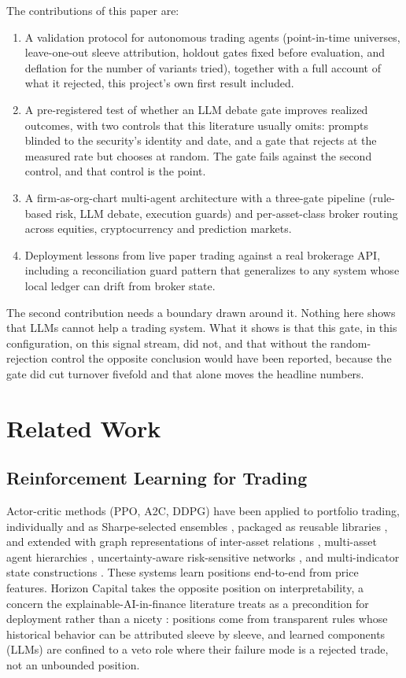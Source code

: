 \documentclass[10pt,twocolumn]{IEEEtran}
\begin{document}
The contributions of this paper are:
\begin{enumerate}
\item A validation protocol for autonomous trading agents (point-in-time
universes, leave-one-out sleeve attribution, holdout gates fixed before
evaluation, and deflation for the number of variants tried), together with
a full account of what it rejected, this project's own first result included.
\item A pre-registered test of whether an LLM debate gate improves realized
outcomes, with two controls that this literature usually omits: prompts
blinded to the security's identity and date, and a gate that rejects at the
measured rate but chooses at random. The gate fails against the second
control, and that control is the point.
\item A firm-as-org-chart multi-agent architecture with a three-gate pipeline
(rule-based risk, LLM debate, execution guards) and per-asset-class broker
routing across equities, cryptocurrency and prediction markets.
\item Deployment lessons from live paper trading against a real brokerage
API, including a reconciliation guard pattern that generalizes to any system
whose local ledger can drift from broker state.
\end{enumerate}

The second contribution needs a boundary drawn around it. Nothing here shows
that LLMs cannot help a trading system. What it shows is that this gate, in
this configuration, on this signal stream, did not, and that without the
random-rejection control the opposite conclusion would have been reported,
because the gate did cut turnover fivefold and that alone moves the headline
numbers.

\section{Related Work}

\subsection{Reinforcement Learning for Trading}
Actor-critic methods (PPO, A2C, DDPG) have been applied to portfolio
trading, individually and as Sharpe-selected ensembles
\cite{yang2020ensemble,xiong2018practical,jiang2017deep}, packaged as
reusable libraries \cite{liu2020finrl}, and extended with graph
representations of inter-asset relations \cite{sun2024graphsage,
sun2024dynamic}, multi-asset agent hierarchies \cite{kim2025mama},
uncertainty-aware risk-sensitive networks \cite{park2024uncertainty}, and
multi-indicator state constructions \cite{liu2025qtmrl}. These systems learn
positions end-to-end from price features. Horizon Capital takes the opposite
position on interpretability, a concern the explainable-AI-in-finance
literature treats as a precondition for deployment rather than a nicety
\cite{cerneviciene2024xai,bartram2020ai}: positions come from transparent
rules whose historical behavior can be attributed sleeve by sleeve, and
learned components (LLMs) are confined to a veto role where their failure
mode is a rejected trade, not an unbounded position.
\end{document}
